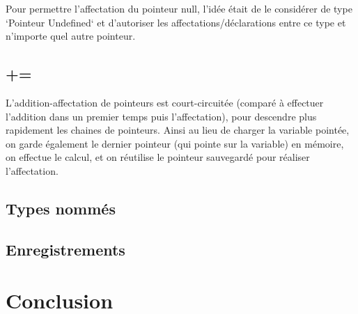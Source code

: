 \documentclass[headings=standardclasses,parskip=half]{scrartcl}
\begin{document}
Pour permettre l'affectation du pointeur null, l'idée était de le considérer de type `Pointeur Undefined` et d'autoriser les affectations/déclarations entre ce type et n'importe quel autre pointeur.

\subsection{+=}

L'addition-affectation de pointeurs est court-circuitée (comparé à effectuer l'addition dans un premier temps puis l'affectation), pour descendre plus rapidement les chaines de pointeurs.
Ainsi au lieu de charger la variable pointée, on garde également le dernier pointeur (qui pointe sur la variable) en mémoire, on effectue le calcul, et on réutilise le pointeur sauvegardé pour réaliser l'affectation.


\subsection{Types nommés}

\subsection{Enregistrements}

\section{Conclusion}
\end{document}
